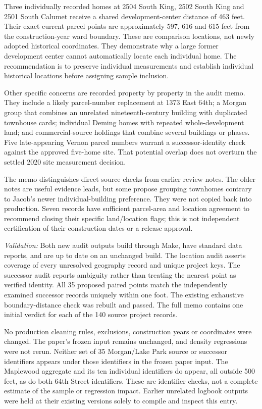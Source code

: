 Three individually recorded homes at 2504 South King, 2502 South King and
2501 South Calumet receive a shared development-center distance of 463 feet.
Their exact current parcel points are approximately 597, 616 and 615 feet from
the construction-year ward boundary. These are comparison locations, not
newly adopted historical coordinates. They demonstrate why a large former
development center cannot automatically locate each individual home.
The recommendation is to preserve individual measurements and establish
individual historical locations before assigning sample inclusion.

Other specific concerns are recorded property by property in the audit memo.
They include a likely parcel-number replacement at 1373 East 64th; a Morgan
group that combines an unrelated nineteenth-century building with duplicated
townhouse cards; individual Deming homes with repeated whole-development land;
and commercial-source holdings that combine several buildings or phases.
Five late-appearing Vernon parcel numbers warrant a successor-identity check
against the approved five-home site. That potential overlap does not overturn
the settled 2020 site measurement decision.

The memo distinguishes direct source checks from earlier review notes.
The older notes are useful evidence leads, but some propose grouping townhomes
contrary to Jacob's newer individual-building preference. They were not copied
back into production. Seven records have sufficient parcel-area and location
agreement to recommend closing their specific land/location flags; this is
not independent certification of their construction dates or a release approval.

\textit{Validation:} Both new audit outputs build through Make, have standard
data reports, and are up to date on an unchanged build. The location audit asserts
coverage of every unresolved geography record and unique project keys. The
successor audit reports ambiguity rather than treating the nearest point as
verified identity. All 35 proposed paired points match the independently
examined successor records uniquely within one foot. The existing exhaustive
boundary-distance check was rebuilt and passed. The full memo contains one
initial verdict for each of the 140 source project records.

No production cleaning rules, exclusions, construction years or coordinates were
changed. The paper's frozen input remains unchanged, and density regressions
were not rerun. Neither set of 35 Morgan/Lake Park source or successor identifiers
appears under those identifiers in the frozen paper input. The Maplewood aggregate
and its ten individual identifiers do appear, all outside 500 feet, as do both
64th Street identifiers. These are identifier checks, not a complete estimate
of the sample or regression impact. Earlier unrelated logbook outputs were held at their existing
versions solely to compile and inspect this entry.
